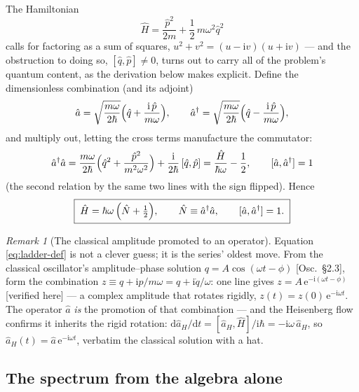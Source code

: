 \documentclass[11pt]{article}
\theoremstyle{plain}
\theoremstyle{definition}
\theoremstyle{remark}
\newtheorem{remark}[theorem]{Remark}
\newcommand{\dd}{\mathrm{d}}
\newcommand{\ee}{\mathrm{e}}
\newcommand{\ii}{\mathrm{i}}
\newcommand{\op}[1]{\hat{#1}}
\begin{document}
The Hamiltonian
\begin{equation}
  \op H = \frac{\op p^2}{2m} + \frac12\,m\omega^2\op q^2
\end{equation}
calls for factoring as a sum of squares,
$u^2 + v^2 = (u - \ii v)(u + \ii v)$ --- and the obstruction to
doing so, $[\op q, \op p] \ne 0$, turns out to carry all of the
problem's quantum content, as the derivation below makes explicit. Define the dimensionless combination (and its adjoint)
\begin{equation}
  \op a
  = \sqrt{\frac{m\omega}{2\hbar}}
    \Bigl(\op q + \frac{\ii\,\op p}{m\omega}\Bigr),
  \qquad
  \op a^\dagger
  = \sqrt{\frac{m\omega}{2\hbar}}
    \Bigl(\op q - \frac{\ii\,\op p}{m\omega}\Bigr),
  \label{eq:ladder-def}
\end{equation}
and multiply out, letting the cross terms manufacture the
commutator:
\begin{equation}
  \op a^\dagger\op a
  = \frac{m\omega}{2\hbar}
    \Bigl(
      \op q^2 + \frac{\op p^2}{m^2\omega^2}
    \Bigr)
  + \frac{\ii}{2\hbar}\,[\op q, \op p]
  = \frac{\op H}{\hbar\omega} - \frac12 ,
  \qquad
  [\op a, \op a^\dagger] = 1
\end{equation}
(the second relation by the same two lines with the sign flipped).
Hence
\begin{equation}
  \boxed{\;
  \op H = \hbar\omega\,\Bigl(\op N + \tfrac12\Bigr),
  \qquad
  \op N \equiv \op a^\dagger \op a,
  \qquad
  [\op a, \op a^\dagger] = 1 .
  \;}
  \label{eq:H-ladder}
\end{equation}

\begin{remark}[The classical amplitude promoted to an operator]
\label{rem:classical-amplitude}
Equation \eqref{eq:ladder-def} is not a clever guess; it is the
series' oldest move. From the classical oscillator's
amplitude--phase solution $q = A\cos(\omega t - \phi)$
[Osc.\ \S2.3], form the combination $z \equiv q + \ii p/m\omega
= q + \ii\dot q/\omega$: one line gives
$z = A\,\ee^{-\ii(\omega t - \phi)}$ [verified here] --- a complex
amplitude that rotates rigidly, $z(t) = z(0)\,\ee^{-\ii\omega t}$.
The operator $\op a$ \emph{is} the promotion of that combination
--- and the Heisenberg flow confirms it inherits the
rigid rotation:
$\dd\op a_H/\dd t = [\op a_H, \op H]/\ii\hbar
= -\ii\omega\,\op a_H$, so
$\op a_H(t) = \op a\,\ee^{-\ii\omega t}$, verbatim the classical
solution with a hat.
\end{remark}

\subsection{The spectrum from the algebra alone}
\label{sec:sho-spectrum}
\end{document}
